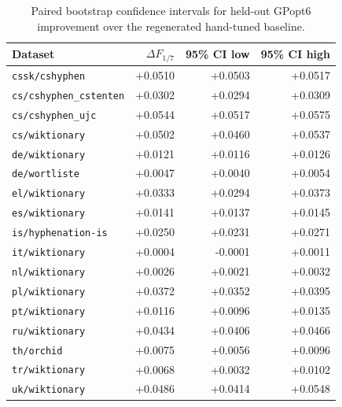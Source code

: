 \begin{table}[t]
\centering\small
\caption{Paired bootstrap confidence intervals for held-out GPopt6 improvement over the regenerated hand-tuned baseline.}
\label{tab:gpopt6-bootstrap}
\begin{tabular}{lrrr}
\toprule
Dataset & $\Delta F_{1/7}$ & 95\% CI low & 95\% CI high \\
\midrule
\texttt{cssk/cshyphen} & +0.0510 & +0.0503 & +0.0517 \\
\texttt{cs/cshyphen\_cstenten} & +0.0302 & +0.0294 & +0.0309 \\
\texttt{cs/cshyphen\_ujc} & +0.0544 & +0.0517 & +0.0575 \\
\texttt{cs/wiktionary} & +0.0502 & +0.0460 & +0.0537 \\
\texttt{de/wiktionary} & +0.0121 & +0.0116 & +0.0126 \\
\texttt{de/wortliste} & +0.0047 & +0.0040 & +0.0054 \\
\texttt{el/wiktionary} & +0.0333 & +0.0294 & +0.0373 \\
\texttt{es/wiktionary} & +0.0141 & +0.0137 & +0.0145 \\
\texttt{is/hyphenation-is} & +0.0250 & +0.0231 & +0.0271 \\
\texttt{it/wiktionary} & +0.0004 & -0.0001 & +0.0011 \\
\texttt{nl/wiktionary} & +0.0026 & +0.0021 & +0.0032 \\
\texttt{pl/wiktionary} & +0.0372 & +0.0352 & +0.0395 \\
\texttt{pt/wiktionary} & +0.0116 & +0.0096 & +0.0135 \\
\texttt{ru/wiktionary} & +0.0434 & +0.0406 & +0.0466 \\
\texttt{th/orchid} & +0.0075 & +0.0056 & +0.0096 \\
\texttt{tr/wiktionary} & +0.0068 & +0.0032 & +0.0102 \\
\texttt{uk/wiktionary} & +0.0486 & +0.0414 & +0.0548 \\
\bottomrule
\end{tabular}
\end{table}
